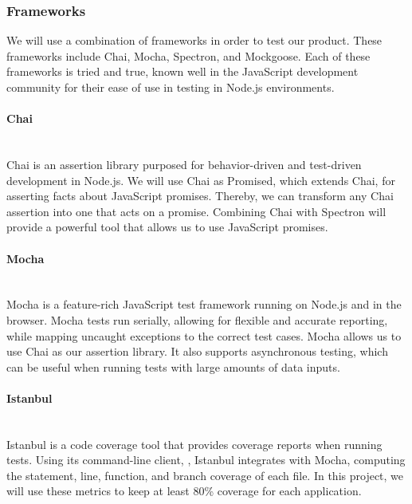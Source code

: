 \subsubsection{Frameworks}
We will use a combination of frameworks in order to test our product. These frameworks include Chai, Mocha, Spectron, and Mockgoose. Each of these frameworks is tried and true, known well in the JavaScript development community for their ease of use in testing in Node.js environments.

\paragraph{Chai} \mbox{}\\[\paragraphheaderspace]
Chai is an assertion library purposed for behavior-driven and test-driven development in Node.js. We will use Chai as Promised, which extends Chai, for asserting facts about JavaScript promises. Thereby, we can transform any Chai assertion into one that acts on a promise. Combining Chai with Spectron will provide a powerful tool that allows us to use JavaScript promises.

\paragraph{Mocha} \mbox{}\\[\paragraphheaderspace]
Mocha is a feature-rich JavaScript test framework running on Node.js and in the browser. Mocha tests run serially, allowing for flexible and accurate reporting, while mapping uncaught exceptions to the correct test cases. Mocha allows us to use Chai as our assertion library. It also supports asynchronous testing, which can be useful when running tests with large amounts of data inputs.

\paragraph{Istanbul} \mbox{}\\[\paragraphheaderspace]
Istanbul is a code coverage tool that provides coverage reports when running tests. Using its command-line client, , Istanbul integrates with Mocha, computing the statement, line, function, and branch coverage of each file. In this project, we will use these metrics to keep at least 80\% coverage for each application.

